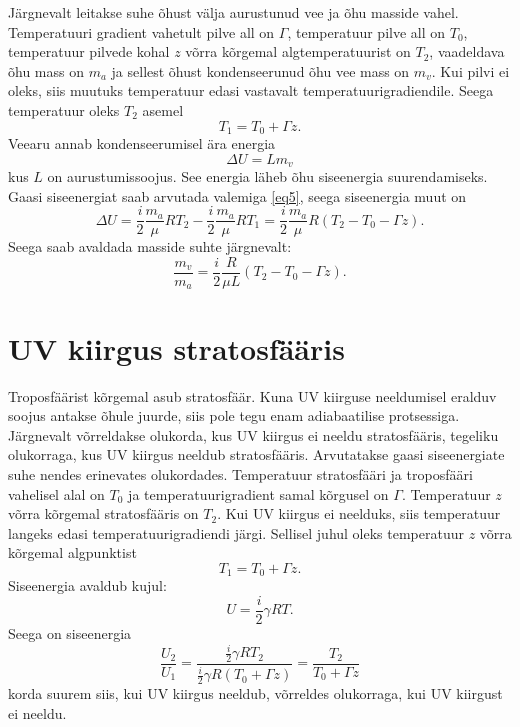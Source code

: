 \documentclass{trkut}%
\begin{document}
Järgnevalt leitakse suhe õhust välja aurustunud vee ja õhu masside vahel. Temperatuuri gradient vahetult pilve all on $\Gamma$, temperatuur pilve all on $T_0$, temperatuur pilvede kohal $z$ võrra kõrgemal algtemperatuurist on $T_2$, vaadeldava õhu mass on $m_a$ ja sellest õhust kondenseerunud õhu vee mass on $m_v$. Kui pilvi ei oleks, siis muutuks temperatuur edasi vastavalt temperatuurigradiendile. Seega temperatuur oleks $T_2$ asemel
\begin{equation*}
T_1 = T_0 + \Gamma z.
\end{equation*}
Veearu annab kondenseerumisel ära energia
\begin{equation*}
\Delta U = L m_v
\end{equation*}
kus $L$ on aurustumissoojus. See energia läheb õhu siseenergia suurendamiseks. Gaasi siseenergiat saab arvutada valemiga \ref{eq5}, seega siseenergia muut on
\begin{equation*}
\Delta U =\frac{i}{2}\frac{m_a}{\mu}RT_2 - \frac{i}{2}\frac{m_a}{\mu}RT_1  = \frac{i}{2}\frac{m_a}{\mu}R\left(T_2 - T_0 - \Gamma z\right).
\end{equation*}
Seega saab avaldada masside suhte järgnevalt:
\begin{equation*}
\frac{m_v}{m_a} = \frac{i}{2}\frac{R}{\mu L}\left(T_2- T_0 - \Gamma z\right).
\end{equation*}



\section{UV kiirgus stratosfääris}
Troposfäärist kõrgemal asub stratosfäär. Kuna UV kiirguse neeldumisel eralduv soojus antakse õhule juurde, siis pole tegu enam adiabaatilise protsessiga. Järgnevalt võrreldakse olukorda, kus UV kiirgus ei neeldu stratosfääris, tegeliku olukorraga, kus UV kiirgus neeldub stratosfääris. Arvutatakse gaasi siseenergiate suhe nendes erinevates olukordades. Temperatuur stratosfääri ja troposfääri vahelisel alal on $T_0$ ja temperatuurigradient samal kõrgusel on $\Gamma$. Temperatuur $z$ võrra kõrgemal stratosfääris on $T_2$. Kui UV kiirgus ei neelduks, siis temperatuur langeks edasi temperatuurigradiendi järgi. Sellisel juhul oleks temperatuur $z$ võrra kõrgemal algpunktist
\begin{equation*}
T_1 = T_0 + \Gamma z.
\end{equation*}
Siseenergia avaldub kujul:
\begin{equation*}
U = \frac{i}{2}\gamma RT.
\end{equation*}
Seega on siseenergia 
\begin{equation*}
\frac{U_2}{U_1} = \frac{\frac{i}{2}\gamma RT_2}{\frac{i}{2}\gamma R\left(T_0 + \Gamma z\right)} = \frac{T_2}{T_0+\Gamma z}
\end{equation*}
korda suurem siis, kui UV kiirgus neeldub, võrreldes olukorraga, kui UV kiirgust ei neeldu.
\end{document}

